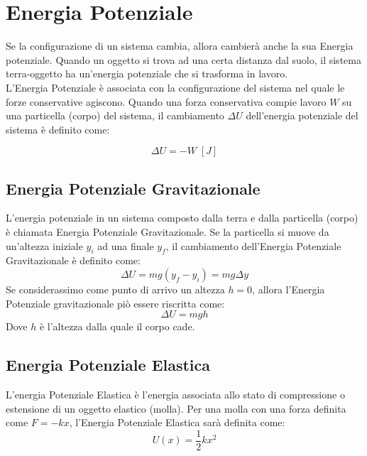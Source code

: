     \section{Energia Potenziale} Se la configurazione di un sistema cambia, 
    allora cambierà anche la sua Energia potenziale. Quando un oggetto si trova
    ad una certa distanza dal suolo, il sistema terra-oggetto ha un'energia 
    potenziale che si trasforma in lavoro. \\
    L'Energia Potenziale è associata con la configurazione del sistema nel 
    quale le forze conservative agiscono. Quando una forza conservativa compie 
    lavoro $W$ su una particella (corpo) del sistema, il cambiamento $\Delta U$ 
    dell'energia potenziale del sistema è definito come:
        
        \begin{equation}
            \Delta U = - W \;[J]
        \end{equation}

        \subsection{Energia Potenziale Gravitazionale}
        \label{en_po_gr}
        L'energia potenziale in 
        un sistema composto dalla terra e dalla particella (corpo) è chiamata 
        Energia Potenziale Gravitazionale. Se la particella si muove da 
        un'altezza iniziale $y_i$ ad una finale $y_f$, il cambiamento 
        dell'Energia Potenziale Gravitazionale è definito come:
        \begin{equation}
            \Delta U = mg(y_f - y_i) = mg \Delta y
        \end{equation}
        Se considerassimo come punto di arrivo un altezza $ h = 0$, allora 
        l'Energia Potenziale gravitazionale piò essere riscritta come:
        \begin{equation}
            \Delta U = mgh
        \end{equation}
        Dove $h$ è l'altezza dalla quale il corpo cade.

        \subsection{Energia Potenziale Elastica} L'energia Potenziale Elastica è 
        l'energia associata allo stato di compressione o estensione di un 
        oggetto elastico (molla). Per una molla con una forza definita come 
        $ F = -kx $, l'Energia Potenziale Elastica sarà definita come:
        \begin{equation}
            U(x)     = \frac{1}{2}kx^2
        \end{equation}

